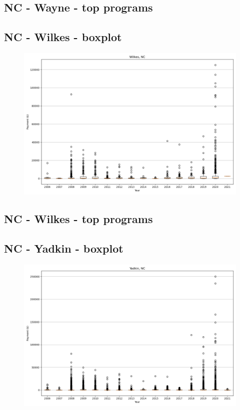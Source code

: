 \subsection*{NC - Wayne - top programs}

\newpage
\subsection*{NC - Wilkes - boxplot}
\begin{figure}[h]
\centering
\includegraphics[width=7in]{../output/boxplots/counties/Wilkes-NC_boxplot.png}
\end{figure}


\subsection*{NC - Wilkes - top programs}

\newpage
\subsection*{NC - Yadkin - boxplot}
\begin{figure}[h]
\centering
\includegraphics[width=7in]{../output/boxplots/counties/Yadkin-NC_boxplot.png}
\end{figure}


